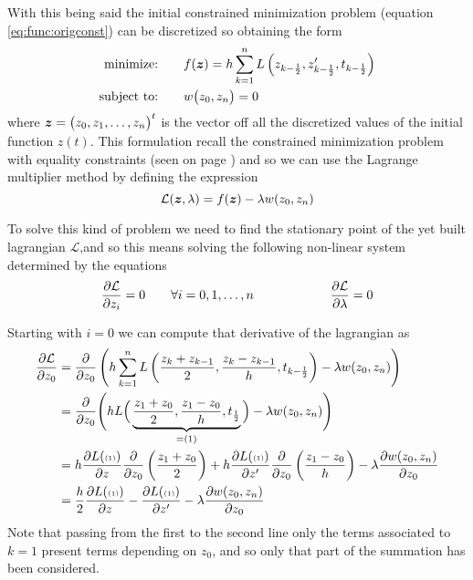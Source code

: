 	With this being said the initial constrained minimization problem (equation \ref{eq:func:origconst}) can be discretized so obtaining the form
	\begin{equation} \label{eq:func:discretized}
		\begin{aligned} 
			\textrm{minimize:}& \qquad f(\boldsymbol{z}) = h \sum_{k=1}^{n} L  \left( z_{k-\frac 1 2}, z_{k-\frac 1 2}', t_{k-\frac 1 2} \right) \\
			\textrm{subject to:}& \qquad w\big(z_0,z_n \big) = 0
		\end{aligned}
	\end{equation}
	where $\boldsymbol{z} = \big(z_0,z_1,\dots,z_n\big)^t$ is the vector off all the discretized values of the initial function $z(t)$. This formulation recall the constrained minimization problem with equality constraints (seen on page \pageref{sec:min:constrainedmin}) and so we can use the Lagrange multiplier method by defining the expression
	\[ \mathcal L   (\boldsymbol{z},\lambda) = f(\boldsymbol{z}) - \lambda w(z_0,z_n) \]
	
	To solve this kind of problem we need to find the stationary point of the yet built lagrangian $\mathcal L  $,and so this means solving the following non-linear system determined by the equations
	\[ \frac{\partial \mathcal L  }{\partial z_i} = 0 \qquad \forall i = 0,1,\dots,n \qquad \qquad \qquad \frac{\partial \mathcal L  }{\partial \lambda} = 0 \]
	
	Starting with $i=0$ we can compute that derivative of the lagrangian as
	\begin{align*}
		\frac{\partial \mathcal L  }{\partial z_0} &= \frac{\partial }{\partial z_0} \left(h \sum_{k=1}^{n} L  \left(\frac{z_k + z_{k-1}}{2},  \frac{z_k - z_{k-1}}{h}  , t_{k-\frac 1 2}   \right) - \lambda w(z_0,z_n) \right) \\
		&= \frac{\partial }{\partial z_0} \Bigg(h L  \Big(\underbrace{\frac{z_1 + z_0}{2},  \frac{z_1 - z_0}{h}  , t_{\frac 1 2}}_{ = (1) }   \Big) - \lambda w(z_0,z_n) \Bigg) \\
		& = h \frac{\partial L ({\scriptscriptstyle (1) })}{\partial z} \frac{\partial }{\partial z_0}\left( \frac{z_1 + z_0}{2} \right) + h \frac{\partial L ({\scriptscriptstyle (1) })}{\partial z'} \frac{\partial }{\partial z_0}\left( \frac{z_1 -  z_0}{h} \right) - \lambda \frac{\partial w(z_0,z_n)}{\partial z_0} \\
		& =  \frac h 2 \frac{\partial L ({\scriptscriptstyle (1) })}{\partial z} - \frac{\partial L ({\scriptscriptstyle (1) })}{\partial z'} - \lambda \frac{\partial w(z_0,z_n)}{\partial z_0} \\
	\end{align*}
	Note that passing from the first to the second line only the terms associated to $k=1$ present terms depending on $z_0$, and so only that part of the summation has been considered.
	
